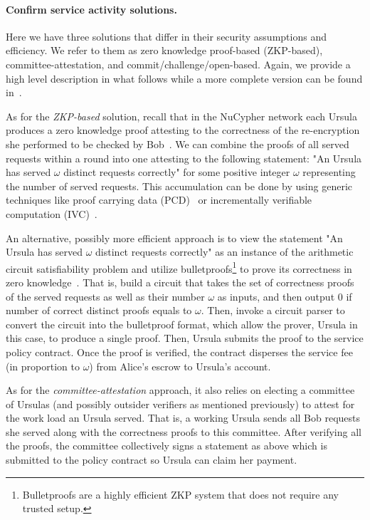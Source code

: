 \documentclass{llncs}
\begin{document}
\paragraph{Confirm service activity solutions.} Here we have three solutions that differ in their security assumptions and efficiency. We refer to them as zero knowledge proof-based (ZKP-based), committee-attestation, and commit/challenge/open-based. Again, we provide a high level description in what follows while a more complete version can be found in~\cite{confirm-activity-draft}. 


As for the \emph{ZKP-based} solution, recall that in the NuCypher network each Ursula produces a zero knowledge proof attesting to the correctness of the re-encryption she performed to be checked by Bob~\cite{umbral2018}. We can combine the proofs of all served requests within a round into one attesting to the following statement: "An Ursula has served $\omega$ distinct requests correctly" for some positive integer $\omega$ representing the number of served requests. This accumulation can be done by using generic techniques like proof carrying data (PCD)~\cite{chiesa2010proof} or incrementally verifiable computation (IVC)~\cite{valiant08}.


An alternative, possibly more efficient approach is to view the statement "An Ursula has served $\omega$ distinct requests correctly" as an instance of the arithmetic circuit satisfiability problem and utilize bulletproofs\footnote{Bulletproofs are a highly efficient ZKP system that does not require any trusted setup.} to prove its correctness in zero knowledge~\cite{bunz18}. That is, build a circuit that takes the set of correctness proofs of the served requests as well as their number $\omega$ as inputs, and then output 0 if number of correct distinct proofs equals to $\omega$. Then, invoke a circuit parser to convert the circuit into the bulletproof format, which allow the prover, Ursula in this case, to produce a single proof. Then, Ursula submits the proof to the service policy contract. Once the proof is verified, the contract disperses the service fee (in proportion to $\omega$) from Alice's escrow to Ursula's account.


As for the \emph{committee-attestation} approach, it also relies on electing a committee of Ursulas (and possibly outsider verifiers as mentioned previously) to attest for the work load an Ursula served. That is, a working Ursula sends all Bob requests she served along with the correctness proofs to this committee. After verifying all the proofs, the committee collectively signs a statement as above which is submitted to the policy contract so Ursula can claim her payment.
\end{document}
